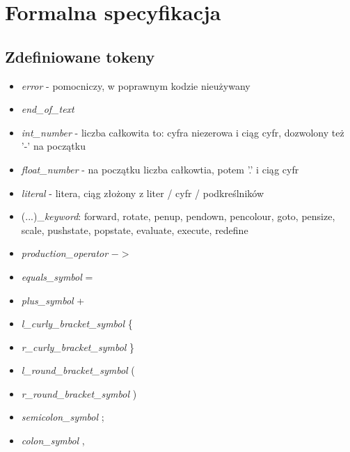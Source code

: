 \documentclass{article}
\begin{document}
\section{Formalna specyfikacja}

\subsection{Zdefiniowane tokeny}
\begin{itemize}
    \item{\textit{error} - pomocniczy, w poprawnym kodzie nieużywany}
    \item{\textit{end\_of\_text}}
    \item{\textit{int\_number} - liczba całkowita to: cyfra niezerowa i ciąg cyfr, dozwolony też '-' na początku}
    \item{\textit{float\_number} - na początku liczba całkowtia, potem '.' i ciąg cyfr}
    \item{\textit{literal} - litera, ciąg złożony z liter / cyfr / podkreślników}
    \item{(...)\_\textit{keyword}: forward, rotate, penup, pendown, pencolour, goto, pensize, scale, pushstate, popstate, evaluate, execute, redefine}
    \item{\textit{production\_operator} $->$ }
    \item{\textit{equals\_symbol} = }
    \item{\textit{plus\_symbol} + }
    \item{\textit{l\_curly\_bracket\_symbol} \{ }
    \item{\textit{r\_curly\_bracket\_symbol} \} }
    \item{\textit{l\_round\_bracket\_symbol} ( }
    \item{\textit{r\_round\_bracket\_symbol} ) }
    \item{\textit{semicolon\_symbol} ; }
    \item{\textit{colon\_symbol} , }
\end{itemize}
\end{document}
